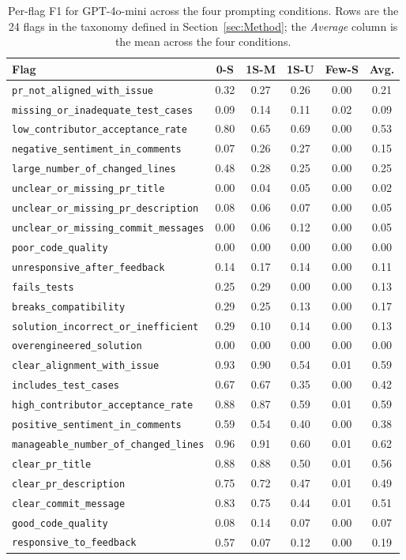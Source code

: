 \begin{table}[!htbp]
\centering
\caption{Per-flag F1 for GPT-4o-mini across the four prompting
conditions. Rows are the 24 flags in the taxonomy defined in
Section~\ref{sec:Method}; the \emph{Average} column is the mean across
the four conditions.}
\label{tab:perflag-gpt-4o-mini}
\small
\begin{tabular}{lccccc}
\toprule
Flag & 0-S & 1S-M & 1S-U & Few-S & Avg. \\
\midrule
\texttt{pr\_not\_aligned\_with\_issue} & 0.32 & 0.27 & 0.26 & 0.00 & 0.21 \\
\texttt{missing\_or\_inadequate\_test\_cases} & 0.09 & 0.14 & 0.11 & 0.02 & 0.09 \\
\texttt{low\_contributor\_acceptance\_rate} & 0.80 & 0.65 & 0.69 & 0.00 & 0.53 \\
\texttt{negative\_sentiment\_in\_comments} & 0.07 & 0.26 & 0.27 & 0.00 & 0.15 \\
\texttt{large\_number\_of\_changed\_lines} & 0.48 & 0.28 & 0.25 & 0.00 & 0.25 \\
\texttt{unclear\_or\_missing\_pr\_title} & 0.00 & 0.04 & 0.05 & 0.00 & 0.02 \\
\texttt{unclear\_or\_missing\_pr\_description} & 0.08 & 0.06 & 0.07 & 0.00 & 0.05 \\
\texttt{unclear\_or\_missing\_commit\_messages} & 0.00 & 0.06 & 0.12 & 0.00 & 0.05 \\
\texttt{poor\_code\_quality} & 0.00 & 0.00 & 0.00 & 0.00 & 0.00 \\
\texttt{unresponsive\_after\_feedback} & 0.14 & 0.17 & 0.14 & 0.00 & 0.11 \\
\texttt{fails\_tests} & 0.25 & 0.29 & 0.00 & 0.00 & 0.13 \\
\texttt{breaks\_compatibility} & 0.29 & 0.25 & 0.13 & 0.00 & 0.17 \\
\texttt{solution\_incorrect\_or\_inefficient} & 0.29 & 0.10 & 0.14 & 0.00 & 0.13 \\
\texttt{overengineered\_solution} & 0.00 & 0.00 & 0.00 & 0.00 & 0.00 \\
\texttt{clear\_alignment\_with\_issue} & 0.93 & 0.90 & 0.54 & 0.01 & 0.59 \\
\texttt{includes\_test\_cases} & 0.67 & 0.67 & 0.35 & 0.00 & 0.42 \\
\texttt{high\_contributor\_acceptance\_rate} & 0.88 & 0.87 & 0.59 & 0.01 & 0.59 \\
\texttt{positive\_sentiment\_in\_comments} & 0.59 & 0.54 & 0.40 & 0.00 & 0.38 \\
\texttt{manageable\_number\_of\_changed\_lines} & 0.96 & 0.91 & 0.60 & 0.01 & 0.62 \\
\texttt{clear\_pr\_title} & 0.88 & 0.88 & 0.50 & 0.01 & 0.56 \\
\texttt{clear\_pr\_description} & 0.75 & 0.72 & 0.47 & 0.01 & 0.49 \\
\texttt{clear\_commit\_message} & 0.83 & 0.75 & 0.44 & 0.01 & 0.51 \\
\texttt{good\_code\_quality} & 0.08 & 0.14 & 0.07 & 0.00 & 0.07 \\
\texttt{responsive\_to\_feedback} & 0.57 & 0.07 & 0.12 & 0.00 & 0.19 \\
\bottomrule
\end{tabular}
\end{table}

